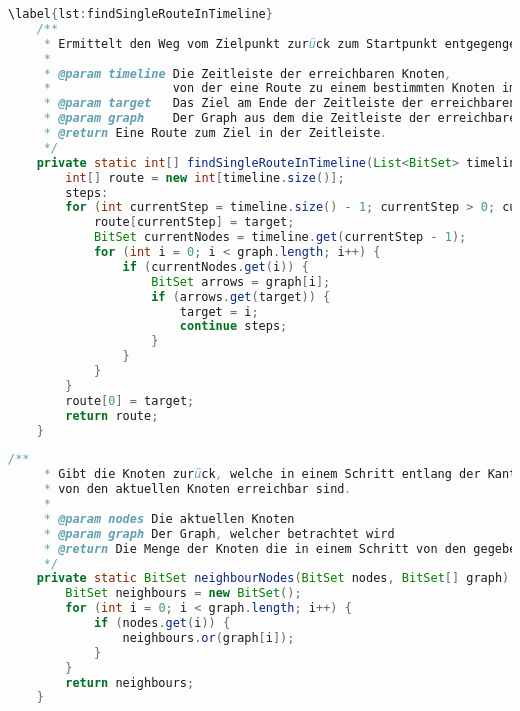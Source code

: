 \documentclass[a4paper,10pt,ngerman]{scrartcl}
\begin{document}
    \begin{lstlisting}[frame=single,language=Java,title=Methode findSingleRouteInTimeline,breaklines=true]
    \label{lst:findSingleRouteInTimeline}
    /**
     * Ermittelt den Weg vom Zielpunkt zurück zum Startpunkt entgegengesetzt der Kantenrichtung des Graphen.
     *
     * @param timeline Die Zeitleiste der erreichbaren Knoten,
     *                 von der eine Route zu einem bestimmten Knoten im letzten Zeitpunkt der Zeitleiste gebaut werden soll.
     * @param target   Das Ziel am Ende der Zeitleiste der erreichbaren Knoten, zudem eine Route gebaut werden soll.
     * @param graph    Der Graph aus dem die Zeitleiste der erreichbaren Knoten (und dementsprechend auch das Ziel) stammt.
     * @return Eine Route zum Ziel in der Zeitleiste.
     */
    private static int[] findSingleRouteInTimeline(List<BitSet> timeline, int target, BitSet[] graph) {
        int[] route = new int[timeline.size()];
        steps:
        for (int currentStep = timeline.size() - 1; currentStep > 0; currentStep--) {
            route[currentStep] = target;
            BitSet currentNodes = timeline.get(currentStep - 1);
            for (int i = 0; i < graph.length; i++) {
                if (currentNodes.get(i)) {
                    BitSet arrows = graph[i];
                    if (arrows.get(target)) {
                        target = i;
                        continue steps;
                    }
                }
            }
        }
        route[0] = target;
        return route;
    }
    \end{lstlisting}

\clearpage

    \begin{lstlisting}[frame=single,language=Java,title=Methode neighbourNodes,breaklines=true]
    /**
     * Gibt die Knoten zurück, welche in einem Schritt entlang der Kantenrichtung,
     * von den aktuellen Knoten erreichbar sind.
     *
     * @param nodes Die aktuellen Knoten
     * @param graph Der Graph, welcher betrachtet wird
     * @return Die Menge der Knoten die in einem Schritt von den gegebenen Knoten erreichbar ist
     */
    private static BitSet neighbourNodes(BitSet nodes, BitSet[] graph) {
        BitSet neighbours = new BitSet();
        for (int i = 0; i < graph.length; i++) {
            if (nodes.get(i)) {
                neighbours.or(graph[i]);
            }
        }
        return neighbours;
    }
    \end{lstlisting}
\end{document}
